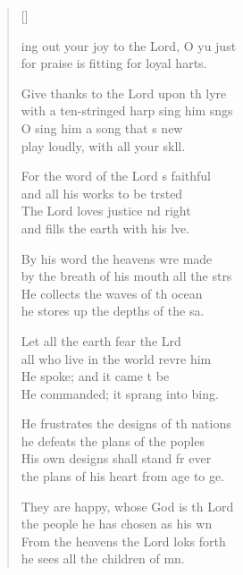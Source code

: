 \settowidth{\versewidth}{Ring out your joy to the Lord, O you just *}
\begin{verse}[\versewidth]
  \begin{patverse}
    ing out your joy to the Lord, O yu just\Med\\
    for praise is fitting for loyal harts.

Give thanks to the Lord upon th lyre\Med\\
    with a ten-stringed harp sing him sngs\\
O sing him a song that \pointup{\i}s new\Med\\
    play loudly, with all your sk\pointup{\i}ll.

For the word of the Lord \pointup{\i}s faithful\Med\\
    and all his works to be trsted\\
The Lord loves justice nd right\Med\\
    and fills the earth with his lve.

By his word the heavens wre made\Med\\
    by the breath of his mouth all the strs\\
He collects the waves of th ocean\Med\\
    he stores up the depths of the sa.

Let all the earth fear the Lrd\Med\\
    all who live in the world revre him\\
He spoke; and it came t be\Med\\
    He commanded; it sprang into bing.

He frustrates the designs of th nations\Med\\
    he defeats the plans of the poples\\
His own designs shall stand fr ever\Med\\
    the plans of his heart from age to ge.

They are happy, whose God is th Lord\Med\\
    the people he has chosen as his wn\\
From the heavens the Lord loks forth\Med\\
    he sees all the children of mn.


\end{patverse}
\end{verse}
